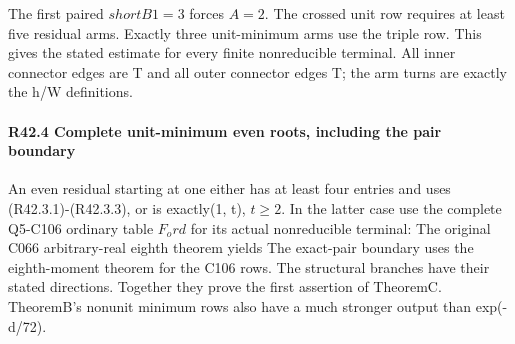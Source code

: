 The first paired \(shortB1=3\) forces \(A=2.\) The crossed unit row requires at
least five residual arms. Exactly three unit-minimum arms use the triple row. This gives the stated estimate for every finite nonreducible terminal. All inner connector
edges are T and all outer connector edges T; the arm turns are exactly
the h/W definitions. 

\paragraph{R42.4 Complete unit-minimum even roots, including the pair boundary}

An even residual starting at one either has at least four entries and
uses (R42.3.1)-(R42.3.3), or is exactly(1, t), \(t\ge 2.\) In the latter case use the
complete Q5-C106 ordinary table \(F_ord\) for its actual nonreducible terminal:
The original C066 arbitrary-real eighth theorem yields
The exact-pair boundary uses the eighth-moment theorem for the C106 rows.
The structural branches have their stated directions. Together they prove
the first assertion of TheoremC. TheoremB's nonunit minimum rows also
have a much stronger output than exp(-d/72).
